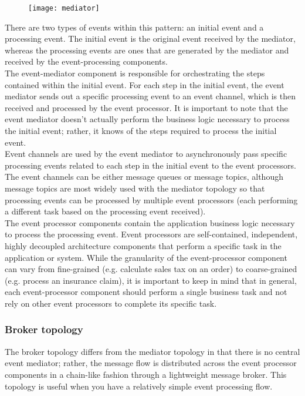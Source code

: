 \documentclass[11pt]{article} %
\begin{document}
\begin{figure} [H]
	\centering
	\texttt{[image: mediator]}
\end{figure}
There are two types of events within this pattern: an initial event and a processing event. The initial event is the original event received by the mediator, whereas the processing events are ones that are generated by the mediator and received by the event-processing components.\\
The event-mediator component is responsible for orchestrating the steps contained within the initial event. For each step in the initial event, the event mediator sends out a specific processing event to an event channel, which is then received and processed by the event processor. It is important to note that the event mediator doesn't actually perform the business logic necessary to process the initial event; rather, it knows of the steps required to process the initial event.\\
Event channels are used by the event mediator to asynchronously pass specific processing events related to each step in the initial event to the event processors. The event channels can be either message queues or message topics, although message topics are most widely used with the mediator topology so that processing events can be processed by multiple event processors (each performing a different task based on the processing event received).\\
The event processor components contain the application business logic necessary to process the processing event. Event processors are self-contained, independent, highly decoupled architecture components that perform a specific task in the application or system. While the granularity of the event-processor component can vary from fine-grained (e.g. calculate sales tax on an order) to coarse-grained (e.g. process an insurance claim), it is important to keep in mind that in general, each event-processor component should perform a single business task and not rely on other event processors to complete its specific task.

\subsubsection{Broker topology}
The broker topology differs from the mediator topology in that there is no central event mediator; rather, the message flow is distributed across the event processor components in a chain-like fashion through a lightweight message broker. This topology is useful when you have a relatively simple event processing flow.
\end{document}
